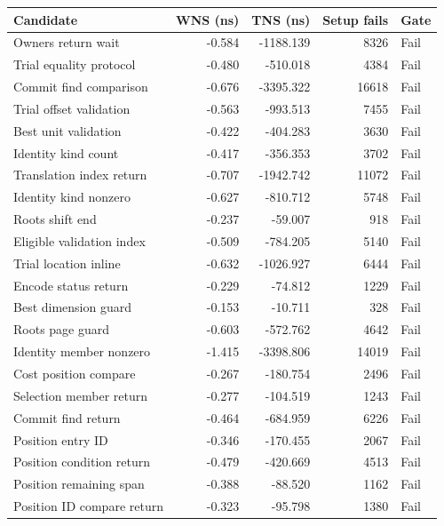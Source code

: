 \begin{tabular}{lrrrl}
\toprule
Candidate & WNS (ns) & TNS (ns) & Setup fails & Gate \\
\midrule
Owners return wait & -0.584 & -1188.139 & 8326 & Fail \\
Trial equality protocol & -0.480 & -510.018 & 4384 & Fail \\
Commit find comparison & -0.676 & -3395.322 & 16618 & Fail \\
Trial offset validation & -0.563 & -993.513 & 7455 & Fail \\
Best unit validation & -0.422 & -404.283 & 3630 & Fail \\
Identity kind count & -0.417 & -356.353 & 3702 & Fail \\
Translation index return & -0.707 & -1942.742 & 11072 & Fail \\
Identity kind nonzero & -0.627 & -810.712 & 5748 & Fail \\
Roots shift end & -0.237 & -59.007 & 918 & Fail \\
Eligible validation index & -0.509 & -784.205 & 5140 & Fail \\
Trial location inline & -0.632 & -1026.927 & 6444 & Fail \\
Encode status return & -0.229 & -74.812 & 1229 & Fail \\
Best dimension guard & -0.153 & -10.711 & 328 & Fail \\
Roots page guard & -0.603 & -572.762 & 4642 & Fail \\
Identity member nonzero & -1.415 & -3398.806 & 14019 & Fail \\
Cost position compare & -0.267 & -180.754 & 2496 & Fail \\
Selection member return & -0.277 & -104.519 & 1243 & Fail \\
Commit find return & -0.464 & -684.959 & 6226 & Fail \\
Position entry ID & -0.346 & -170.455 & 2067 & Fail \\
Position condition return & -0.479 & -420.669 & 4513 & Fail \\
Position remaining span & -0.388 & -88.520 & 1162 & Fail \\
Position ID compare return & -0.323 & -95.798 & 1380 & Fail \\
\bottomrule
\end{tabular}
